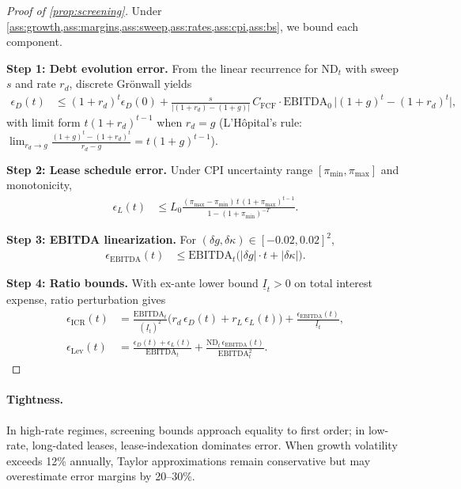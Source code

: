 \documentclass[11pt,a4paper]{article}
\newcommand{\ND}{\mathrm{ND}} %
\newcommand{\EBITDA}{\mathrm{EBITDA}}
\newcommand{\CFCF}{C_{\text{FCF}}}
\newcommand{\pimin}{\pi_{\min}}
\newcommand{\pimax}{\pi_{\max}}
\theoremstyle{plain}
\theoremstyle{definition}
\newcommand{\Cref}[1]{\ref{#1}}
\begin{document}
\begin{proof}[Proof of \Cref{prop:screening}]
Under \Cref{ass:growth,ass:margins,ass:sweep,ass:rates,ass:cpi,ass:bs}, we bound each component.

\textbf{Step 1: Debt evolution error.} From the linear recurrence for $\ND_t$ with sweep $s$ and rate $r_d$, discrete Gr{\"o}nwall yields
\begin{align}
\epsilon_D(t) &\le (1+r_d)^t \epsilon_D(0) + \frac{s}{|(1+r_d)-(1+g)|}\, \CFCF \cdot \EBITDA_0 \,\bigl|(1+g)^t - (1+r_d)^t\bigr|,
\end{align}
with limit form $t(1+r_d)^{t-1}$ when $r_d=g$ (L'H\^opital's rule: $\lim_{r_d \to g} \frac{(1+g)^t - (1+r_d)^t}{r_d - g} = t(1+g)^{t-1}$).

\textbf{Step 2: Lease schedule error.} Under CPI uncertainty range $[\pimin, \pimax]$ and monotonicity,
\begin{align}
\epsilon_L(t) &\le L_0 \frac{(\pimax - \pimin)\, t\, (1 + \pimax)^{t-1}}{1 - (1 + \pimin)^{-T}}.
\end{align}

\textbf{Step 3: EBITDA linearization.} For $(\delta g, \delta \kappa) \in [-0.02, 0.02]^2$,
\begin{align}
\epsilon_{\text{EBITDA}}(t) &\le \EBITDA_t \big(|\delta g| \cdot t + |\delta \kappa|\big).
\end{align}

\textbf{Step 4: Ratio bounds.} With ex-ante lower bound $\underline{I}_t > 0$ on total interest expense, ratio perturbation gives
\begin{align}
\epsilon_{\text{ICR}}(t) &= \frac{\EBITDA_t}{(\underline{I}_t)^2}\bigl(r_d\,\epsilon_D(t)+r_L\,\epsilon_L(t)\bigr) + \frac{\epsilon_{\text{EBITDA}}(t)}{\underline{I}_t},\\
\epsilon_{\text{Lev}}(t) &= \frac{\epsilon_D(t)+\epsilon_L(t)}{\EBITDA_t} + \frac{\ND_t\,\epsilon_{\text{EBITDA}}(t)}{\EBITDA_t^2}.
\end{align}
\end{proof}

\paragraph{Tightness.}
In high-rate regimes, screening bounds approach equality to first order; in low-rate, long-dated leases, lease-indexation dominates error. When growth volatility exceeds 12\% annually, Taylor approximations remain conservative but may overestimate error margins by 20--30\%.
\end{document}
